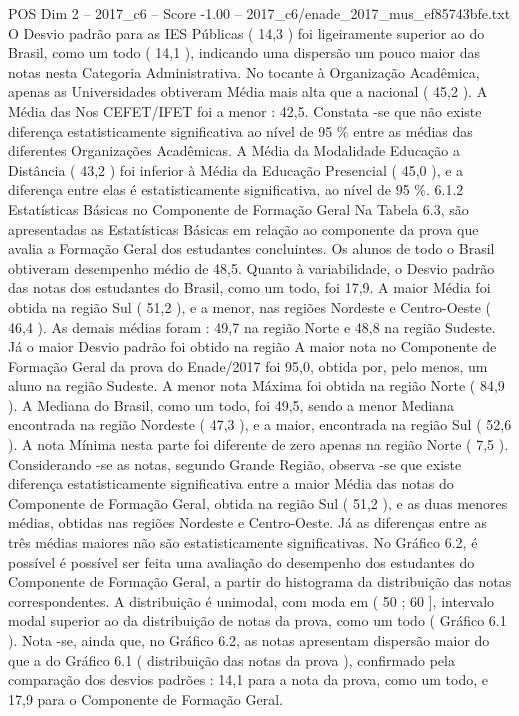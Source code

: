 \begin{textsample}{POS Dim 2 – 2017\_c6 – Score -1.00 – 2017\_c6/enade\_2017\_mus\_ef85743bfe.txt}
O Desvio padrão para as IES Públicas ( 14,3 ) foi ligeiramente superior ao do Brasil, como um todo ( 14,1 ), indicando uma dispersão um pouco maior das notas nesta Categoria Administrativa.
No tocante à Organização Acadêmica, apenas as Universidades obtiveram Média mais alta que a nacional ( 45,2 ).
A Média das Nos CEFET/IFET foi a menor : 42,5.
Constata -se que não existe diferença estatisticamente significativa ao nível de 95 \% entre as médias das diferentes Organizações Acadêmicas.
A Média da Modalidade Educação a Distância ( 43,2 ) foi inferior à Média da Educação Presencial ( 45,0 ), e a diferença entre elas é estatisticamente significativa, ao nível de 95 \%. 6.1.2 Estatísticas Básicas no Componente de Formação Geral Na Tabela 6.3, são apresentadas as Estatísticas Básicas em relação ao componente da prova que avalia a Formação Geral dos estudantes concluintes.
Os alunos de todo o Brasil obtiveram desempenho médio de 48,5.
Quanto à variabilidade, o Desvio padrão das notas dos estudantes do Brasil, como um todo, foi 17,9.
A maior Média foi obtida na região Sul ( 51,2 ), e a menor, nas regiões Nordeste e Centro-Oeste ( 46,4 ).
As demais médias foram : 49,7 na região Norte e 48,8 na região Sudeste.
Já o maior Desvio padrão foi obtido na região A maior nota no Componente de Formação Geral da prova do Enade/2017 foi 95,0, obtida por, pelo menos, um aluno na região Sudeste.
A menor nota Máxima foi obtida na região Norte ( 84,9 ).
A Mediana do Brasil, como um todo, foi 49,5, sendo a menor Mediana encontrada na região Nordeste ( 47,3 ), e a maior, encontrada na região Sul ( 52,6 ).
A nota Mínima nesta parte foi diferente de zero apenas na região Norte ( 7,5 ).
Considerando -se as notas, segundo Grande Região, observa -se que existe diferença estatisticamente significativa entre a maior Média das notas do Componente de Formação Geral, obtida na região Sul ( 51,2 ), e as duas menores médias, obtidas nas regiões Nordeste e Centro-Oeste.
Já as diferenças entre as três médias maiores não são estatisticamente significativas.
No Gráfico 6.2, é possível é possível ser feita uma avaliação do desempenho dos estudantes do Componente de Formação Geral, a partir do histograma da distribuição das notas correspondentes.
A distribuição é unimodal, com moda em ( 50 ; 60 ], intervalo modal superior ao da distribuição de notas da prova, como um todo ( Gráfico 6.1 ).
Nota -se, ainda que, no Gráfico 6.2, as notas apresentam dispersão maior do que a do Gráfico 6.1 ( distribuição das notas da prova ), confirmado pela comparação dos desvios padrões : 14,1 para a nota da prova, como um todo, e 17,9 para o Componente de Formação Geral.

\end{textsample}
